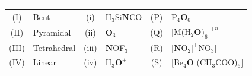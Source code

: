 \documentclass[10pt]{extarticle}
\begin{document}
\begin{center}\small\setlength{\tabcolsep}{4pt}
\begin{tabular}{|c|p{3cm}|c|p{4cm}|c|p{4.5cm}|}\hline
{} &  & \\\hline
(I) & Bent & (i) & H$_3$Si$\mathbf{N}$CO & (P) & P$_4\mathbf{O}_6$\\\hline
(II) & Pyramidal & (ii) & $\mathbf{O}_3$ & (Q) & {[}M(H$_2\mathbf{O})_6]^{+n}$\\\hline
(III) & Tetrahedral & (iii) & $\mathbf{N}$OF$_3$ & (R) & {[}$\mathbf{N}$O$_2]^+$\newline{[}NO$_3]^-$\\\hline
(IV) & Linear & (iv) & H$_3\mathbf{O}^+$ & (S) & {[}Be$_4\mathbf{O}$ (CH$_3$COO)$_6]$\\\hline
\end{tabular}
\end{center}
\end{document}
